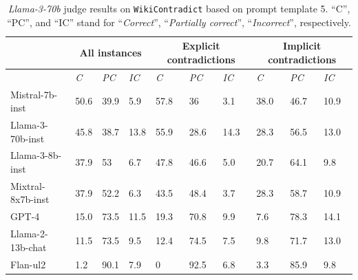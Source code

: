 \begin{table}[h]
    \centering

    \caption{\emph{Llama-3-70b} judge results on \texttt{WikiContradict} based on prompt template 5. ``C'', ``PC'', and ``IC'' stand for ``\emph{Correct}'', ``\emph{Partially correct}'', ``\emph{Incorrect}'', respectively.}
    \label{tab:auto_eval_all}
    \begin{small}
    \begin{tabular}{|l|p{0.7cm}|p{0.7cm}|p{0.7cm}|p{0.8cm}|p{0.8cm}|p{0.8cm}|p{0.8cm}|p{0.8cm}|p{0.8cm}|}
    \hline
        & \multicolumn{3}{c|}{\textbf{All instances}}& \multicolumn{3}{c|}{\textbf{Explicit contradictions }} & \multicolumn{3}{c|}{\textbf{Implicit contradictions}}\\ \hline
        ~ & \emph{C} & \emph{PC} & \emph{IC} & \emph{C} & \emph{PC} & \emph{IC} & \emph{C} & \emph{PC} & \emph{IC}\\ \hline
        Mistral-7b-inst& 50.6 & 39.9 & 5.9 & 57.8 & 36 & 3.1 & 38.0 & 46.7 & 10.9 \\ \hline
        Llama-3-70b-inst & 45.8 & 38.7 & 13.8 & 55.9 & 28.6 & 14.3 & 28.3 & 56.5 & 13.0 \\ \hline
        Llama-3-8b-inst & 37.9 & 53 & 6.7 & 47.8 & 46.6 & 5.0 & 20.7 & 64.1 & 9.8 \\ \hline
        Mixtral-8x7b-inst & 37.9 & 52.2 & 6.3 & 43.5 & 48.4 & 3.7 & 28.3 & 58.7 & 10.9 \\ \hline
        GPT-4 & 15.0 & 73.5 & 11.5 & 19.3 & 70.8 & 9.9 & 7.6 & 78.3 & 14.1 \\ \hline
        Llama-2-13b-chat & 11.5 & 73.5 & 9.5 & 12.4 & 74.5 & 7.5 & 9.8 & 71.7 & 13.0 \\ \hline
        Flan-ul2 & 1.2 & 90.1 & 7.9 & 0 & 92.5 & 6.8 & 3.3 & 85.9 & 9.8 \\ \hline    \end{tabular}
     \end{small}
\end{table}
